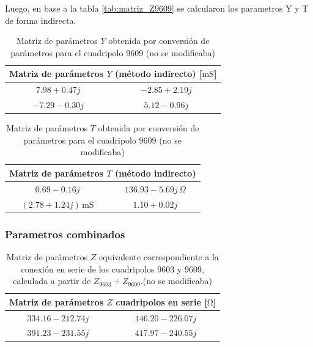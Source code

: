 Luego, en base a la tabla \ref{tab:matriz_Z9609} se calcularon los parametros Y y T de forma indirecta.
	
	\begin{table}[H]
\centering
\begin{tabular}{|c|c|}
\hline
\multicolumn{2}{|c|}{\textbf{Matriz de parámetros $Y$ (método indirecto) [$\mathrm{mS}$]}} \\ \hline
$7.98 + 0.47j\,$ & $-2.85 + 2.19j\,$ \\ \hline
$-7.29 - 0.30j\,$ & $5.12 - 0.96j\,$ \\ \hline
\end{tabular}
\caption{Matriz de parámetros $Y$ obtenida por conversión de parámetros para el cuadripolo 9609 (no se modificaba)}
\label{tab:matriz_Y9609_indirecta}
\end{table}

\begin{table}[H]
\centering
\begin{tabular}{|c|c|}
\hline
\multicolumn{2}{|c|}{\textbf{Matriz de parámetros $T$ (método indirecto)}} \\ \hline
$0.69 - 0.16j$ & $136.93 - 5.69j\,\Omega$ \\ \hline
$(2.78 + 1.24j)\,\mathrm{mS}$ & $1.10 + 0.02j$ \\ \hline
\end{tabular}
\caption{Matriz de parámetros $T$ obtenida por conversión de parámetros para el cuadripolo 9609 (no se modificaba)}
\label{tab:matriz_T9609_indirecta}
\end{table}

	\subsubsection{Parametros combinados}
	
\begin{table}[H]
\centering
\begin{tabular}{|c|c|}
\hline
\multicolumn{2}{|c|}{\textbf{Matriz de parámetros $Z$ cuadripolos en serie [$\mathrm{\Omega}$]}} \\ \hline
$334.16 - 212.74j\,$ & $146.20 - 226.07j\,$ \\ \hline
$391.23 - 231.55j\,$ & $417.97 - 240.55j\,$ \\ \hline
\end{tabular}
\caption{Matriz de parámetros $Z$ equivalente correspondiente a la conexión en serie de los cuadripolos 9603 y 9609, calculada a partir de $Z_{9603} + Z_{9609}$.(no se modificaba)}
\label{tab:matriz_Z_serie_9603_9609 }
\end{table}

